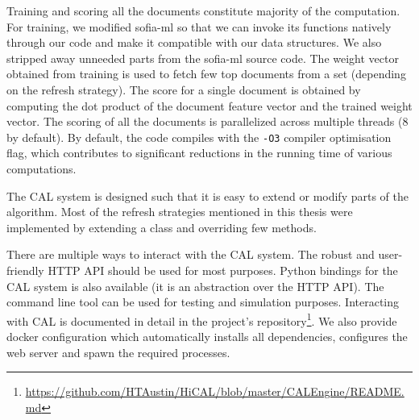 Training and scoring all the documents constitute majority of the computation.
For training, we modified sofia-ml so that we can invoke its functions natively
through our code and make it compatible with our data structures. We also
stripped away unneeded parts from the sofia-ml source code. The weight vector
obtained from training is used to fetch few top documents from a set (depending
on the refresh strategy). The score for a single document is obtained by
computing the dot product of the document feature vector and the trained
weight vector. The scoring of all the documents is parallelized across multiple
threads (8 by default). By default, the code compiles with the \texttt{-O3}
compiler optimisation flag, which contributes to significant reductions in the
running time of various computations.

The CAL system is designed such that it is easy to extend or modify parts of the
algorithm. Most of the refresh strategies mentioned in this thesis were
implemented by extending a class and overriding few methods.

There are multiple ways to interact with the CAL system. The robust and user-friendly
HTTP API should be used for most purposes. Python bindings for the CAL system is
also available (it is an abstraction over the HTTP API). The command line tool
can be used for testing and simulation purposes. Interacting with CAL is
documented in detail in the project's
repository\footnote{\url{https://github.com/HTAustin/HiCAL/blob/master/CALEngine/README.md}}.
We also provide docker configuration which automatically installs all
dependencies, configures the web server and spawn the required processes.
